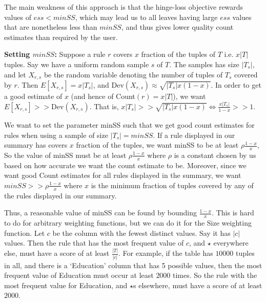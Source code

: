 \documentclass[10pt,journal,compsoc]{IEEEtran}
\newcommand{\stitle}[1]{\vspace{0.5em}\noindent\textbf{#1}}
\begin{document}
{The main weakness of this approach is that the hinge-loss objective rewards values of $ess < minSS$, which may lead us to all leaves having large $ess$ values that are nonetheless less than $minSS$, and thus gives lower quality count estimates than required by the user.

\stitle{Setting $minSS$:}
Suppose a rule $r$ covers $x$ fraction of the tuples of $T$ i.e. $x|T|$ tuples. Say we have a uniform random sample $s$ of $T$. The samples has size $|T_s|$, and let $X_{r,s}$ be the random variable denoting the number of tuples of $T_s$ covered by $r$. Then $E\left[ X_{r,s} \right] = x|T_s|$, and $\text{Dev}(X_{r,s}) \approx \sqrt{|T_s|x(1-x)}$. In order to get a good estimate of $x$ (and hence of Count$(r) = x|T|$), we want $E\left[X_{r,s}\right] >> \text{Dev}(X_{r,s})$. That is, $x|T_s| >> \sqrt{|T_s|x(1-x)} \Leftrightarrow \frac{x|T_s|}{1-x} >> 1$. 

We want to set the parameter minSS such that we get good count estimates for rules when using a sample of size $|T_s| = minSS$. If a rule displayed in our summary has covers $x$ fraction of the tuples, we want minSS to be at least $\rho\frac{1-x}{x}$, So the value of minSS must be at least $\rho\frac{1-x}{x}$ where $\rho$ is a constant chosen by us based on how accurate we want the count estimate to be. Moreover, since we want good Count estimates for all rules displayed in the summary, we want $minSS >> \rho\frac{1-x}{x}$ where $x$ is the minimum fraction of tuples covered by any of the rules displayed in our summary.

Thus, a reasonable value of minSS can be found by bounding $\frac{1-x}{x}$. This is hard to do for arbitrary weighting functions, but we can do it for the Size weighting function. Let $c$ be the column with the fewest distinct values. Say it has $|c|$ values. Then the rule that has the most frequent value of $c$, and $\star$ everywhere else, must have a score of at least $\frac{|T|}{|c|}$. For example, if the table has $10000$ tuples in all, and there is a `Education' column that has 5 possible values, then the most frequent value of Education must occur at least $2000$ times. So the rule with the most frequent value for Education, and $\star$s elsewhere, must have a score of at least $2000$. 

}
\end{document}
